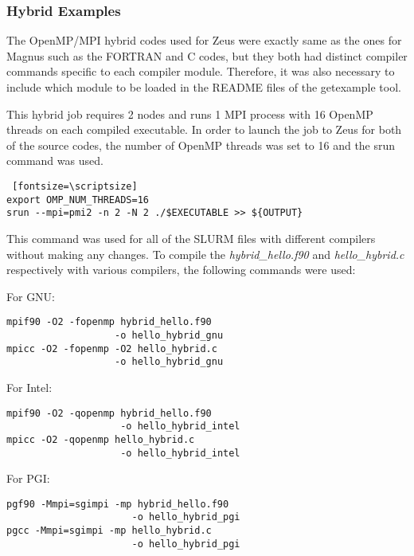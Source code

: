 \subsubsection{Hybrid Examples}

The OpenMP/MPI hybrid codes used for Zeus were exactly same as the ones for Magnus such as the FORTRAN and C codes, but they both had distinct compiler 
commands specific to each compiler module. Therefore, it was also necessary to include which module to be loaded in the README files of the getexample 
tool.

This hybrid job requires 2 nodes and runs 1 MPI process with 16 OpenMP threads on each compiled executable. In order to launch the job to Zeus for both 
of the source codes, the number of OpenMP threads was set to 16 and the srun command was used.

\begin{tcolorbox}
\begin{Verbatim} [fontsize=\scriptsize]
export OMP_NUM_THREADS=16
srun --mpi=pmi2 -n 2 -N 2 ./$EXECUTABLE >> ${OUTPUT}
\end{Verbatim}
\end{tcolorbox}

This command was used for all of the SLURM files with different compilers without making any changes. To compile the \emph{hybrid\_hello.f90} and 
\emph{hello\_hybrid.c} respectively with various compilers, the following commands were used:

For GNU:

\begin{tcolorbox}
\begin{Verbatim}[fontsize=\scriptsize]
mpif90 -O2 -fopenmp hybrid_hello.f90 
                   -o hello_hybrid_gnu
mpicc -O2 -fopenmp -O2 hello_hybrid.c 
                   -o hello_hybrid_gnu
\end{Verbatim}
\end{tcolorbox}


For Intel:

\begin{tcolorbox}
\begin{Verbatim}[fontsize=\scriptsize]
mpif90 -O2 -qopenmp hybrid_hello.f90 
                    -o hello_hybrid_intel
mpicc -O2 -qopenmp hello_hybrid.c 
                    -o hello_hybrid_intel
\end{Verbatim}
\end{tcolorbox}

For PGI:

\begin{tcolorbox}
\begin{Verbatim}[fontsize=\scriptsize]
pgf90 -Mmpi=sgimpi -mp hybrid_hello.f90 
                      -o hello_hybrid_pgi
pgcc -Mmpi=sgimpi -mp hello_hybrid.c 
                      -o hello_hybrid_pgi
\end{Verbatim}
\end{tcolorbox}
